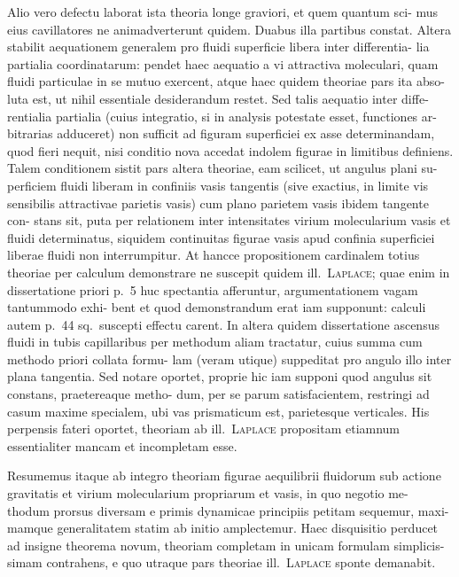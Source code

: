 \documentclass[12pt,a4paper]{article}
\theoremstyle{gauss}
\begin{document}
Alio vero defectu laborat ista theoria longe graviori, et quem quantum sci-
mus eius cavillatores ne animadverterunt quidem. Duabus illa partibus constat.
Altera stabilit aequationem generalem pro fluidi superficie libera inter differentia-
lia partialia coordinatarum: pendet haec aequatio a vi attractiva moleculari, quam
fluidi particulae in se mutuo exercent, atque haec quidem theoriae pars ita abso-
luta est, ut nihil essentiale desiderandum restet. Sed talis aequatio inter diffe-
rentialia partialia (cuius integratio, si in analysis potestate esset, functiones ar-
bitrarias adduceret) non sufficit ad figuram superficiei ex asse determinandam,
quod fieri nequit, nisi conditio nova accedat indolem figurae in limitibus definiens.
Talem conditionem sistit pars altera theoriae, eam scilicet, ut angulus plani su-
perficiem fluidi liberam in confiniis vasis tangentis (sive exactius, in limite vis
sensibilis attractivae parietis vasis) cum plano parietem vasis ibidem tangente con-
stans sit, puta per relationem inter intensitates virium molecularium vasis et fluidi
determinatus, siquidem continuitas figurae vasis apud confinia superficiei liberae
fluidi non interrumpitur. At hancce propositionem cardinalem totius theoriae per
calculum demonstrare ne suscepit quidem ill.~\textsc{Laplace}; quae enim in dissertatione
priori p.~5 huc spectantia afferuntur, argumentationem vagam tantummodo exhi-
bent et quod demonstrandum erat iam supponunt: calculi autem p.~44 sq.~suscepti
effectu carent. In altera quidem dissertatione ascensus fluidi in tubis capillaribus
per methodum aliam tractatur, cuius summa cum methodo priori collata formu-
lam (veram utique) suppeditat pro angulo illo inter plana tangentia. Sed notare
oportet, proprie hic iam supponi quod angulus sit constans, praetereaque metho-
dum, per se parum satisfacientem, restringi ad casum maxime specialem, ubi vas
prismaticum est, parietesque verticales. His perpensis fateri oportet, theoriam
ab ill.~\textsc{Laplace} propositam etiamnum essentialiter mancam et incompletam esse.

Resumemus itaque ab integro theoriam figurae aequilibrii fluidorum sub
actione gravitatis et virium molecularium propriarum et vasis, in quo negotio me-
thodum prorsus diversam e primis dynamicae principiis petitam sequemur, maxi-
mamque generalitatem statim ab initio amplectemur. Haec disquisitio perducet
ad insigne theorema novum, theoriam completam in unicam formulam simplicis-
simam contrahens, e quo utraque pars theoriae ill.~\textsc{Laplace} sponte demanabit.
\end{document}
